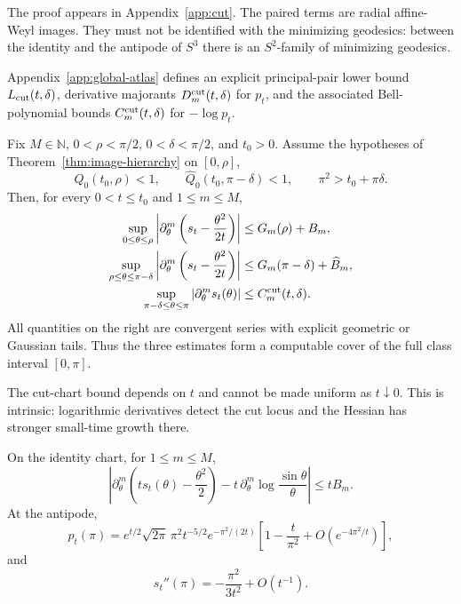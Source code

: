 The proof appears in Appendix~\ref{app:cut}.  The paired terms are radial
affine-Weyl images.  They must not be identified with the minimizing
geodesics: between the identity and the antipode of $S^3$ there is an
$S^2$-family of minimizing geodesics.

Appendix~\ref{app:global-atlas} defines an explicit principal-pair lower bound
$L_{\rm cut}(t,\delta)$, derivative majorants $D_m^{\rm cut}(t,\delta)$ for
$p_t$, and the associated Bell-polynomial bounds $C_m^{\rm cut}(t,\delta)$
for $-\log p_t$.

\begin{theorem}\label{thm:global-atlas}
Fix $M\in\mathbb N$, $0<\rho<\pi/2$, $0<\delta<\pi/2$, and $t_0>0$.
Assume the hypotheses of Theorem~\ref{thm:image-hierarchy} on $[0,\rho]$,
\[
 Q_0(t_0,\rho)<1,\qquad
 \widehat Q_0(t_0,\pi-\delta)<1,
 \qquad \pi^2>t_0+\pi\delta.
\]
Then, for every $0<t\le t_0$ and $1\le m\le M$,
\begin{align}
 \sup_{0\le\theta\le\rho}
 \left|\partial_\theta^m\left(s_t-\frac{\theta^2}{2t}\right)\right|
 &\le G_m(\rho)+B_m,\label{eq:global-id}\\
 \sup_{\rho\le\theta\le\pi-\delta}
 \left|\partial_\theta^m\left(s_t-\frac{\theta^2}{2t}\right)\right|
 &\le G_m(\pi-\delta)+\widehat B_m,\label{eq:global-transition}\\
 \sup_{\pi-\delta\le\theta\le\pi}
 |\partial_\theta^m s_t(\theta)|
 &\le C_m^{\rm cut}(t,\delta).\label{eq:global-cut}
\end{align}
All quantities on the right are convergent series with explicit geometric or
Gaussian tails.  Thus the three estimates form a computable cover of the
full class interval $[0,\pi]$.
\end{theorem}

The cut-chart bound depends on $t$ and cannot be made uniform as
$t\downarrow0$.  This is intrinsic: logarithmic derivatives detect the cut
locus and the Hessian has stronger small-time growth there.

\begin{theorem}\label{thm:small-time}
On the identity chart, for $1\le m\le M$,
\begin{equation}\label{eq:small-time-explicit}
 \left|\partial_\theta^m\left(t s_t(\theta)-\frac{\theta^2}{2}\right)
 -t\,\partial_\theta^m\log\frac{\sin\theta}{\theta}\right|
 \le t B_m.
\end{equation}
At the antipode,
\begin{equation}\label{eq:antipode-asymptotic}
 p_t(\pi)=e^{t/2}\sqrt{2\pi}\,\pi^2t^{-5/2}
 e^{-\pi^2/(2t)}
 \left[1-\frac{t}{\pi^2}+O\!\left(e^{-4\pi^2/t}\right)\right],
\end{equation}
and
\begin{equation}\label{eq:antipode-hessian}
 s_t''(\pi)=-\frac{\pi^2}{3t^2}+O(t^{-1}).
\end{equation}
\end{theorem}

